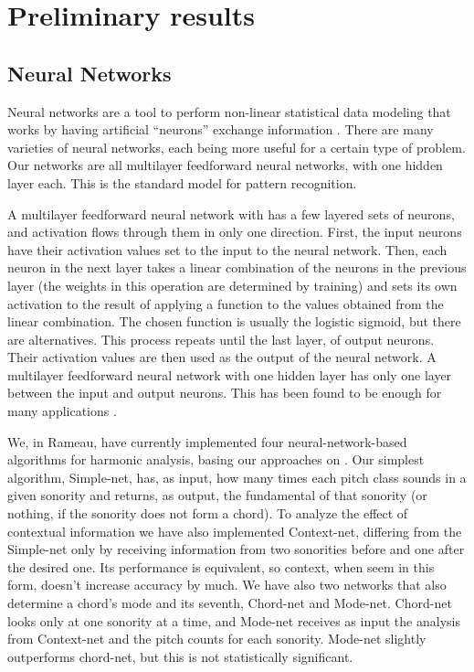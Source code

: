 \documentclass{article}
\begin{document}
\section{Preliminary results}
\label{sec:analysis-results}

\subsection{Neural Networks}
\label{sec:neural-nets}

Neural networks are a tool to perform non-linear statistical data
modeling that works by having artificial ``neurons'' exchange
information \cite{tsui02:_harmon_analy_using_neural_networ}. There are
many varieties of neural networks, each being more useful for a
certain type of problem. Our networks are all multilayer feedforward
neural networks, with one hidden layer each. This is the standard
model for pattern recognition.

A multilayer feedforward neural network with has a few layered sets of
neurons, and activation flows through them in only one
direction. First, the input neurons have their activation values set
to the input to the neural network. Then, each neuron in the next
layer takes a linear combination of the neurons in the previous layer
(the weights in this operation are determined by training) and sets
its own activation to the result of applying a function to the values
obtained from the linear combination. The chosen function is usually
the logistic sigmoid, but there are alternatives. This process repeats
until the last layer, of output neurons. Their activation values are
then used as the output of the neural network. A multilayer
feedforward neural network with one hidden layer has only one layer
between the input and output neurons. This has been found to be enough
for many applications \cite{tsui02:_harmon_analy_using_neural_networ}.

We, in Rameau, have currently implemented four neural-network-based
algorithms for harmonic analysis, basing our approaches on
\cite{tsui02:_harmon_analy_using_neural_networ}. Our simplest
algorithm, Simple-net, has, as input, how many times each pitch class
sounds in a given sonority and returns, as output, the fundamental of
that sonority (or nothing, if the sonority does not form a chord). To
analyze the effect of contextual information we have also implemented
Context-net, differing from the Simple-net only by receiving
information from two sonorities before and one after the desired
one. Its performance is equivalent, so context, when seem in this
form, doesn't increase accuracy by much. We have also two networks
that also determine a chord's mode and its seventh, Chord-net and
Mode-net. Chord-net looks only at one sonority at a time, and Mode-net
receives as input the analysis from Context-net and the pitch counts
for each sonority. Mode-net slightly outperforms chord-net, but this
is not statistically significant.
\end{document}
